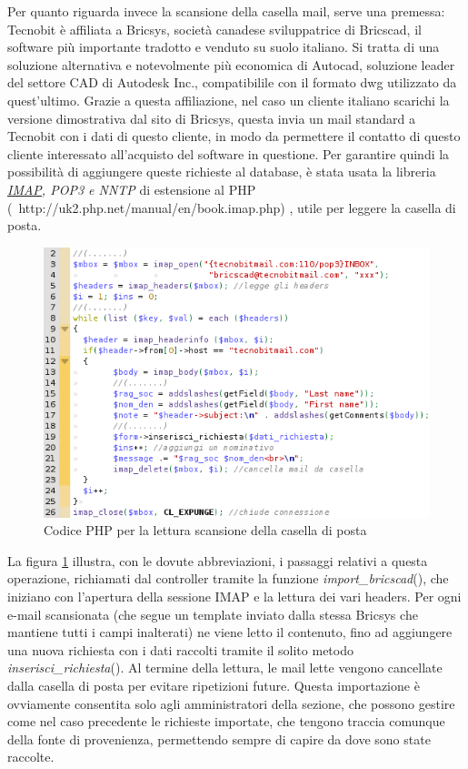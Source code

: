 \noindent
Per quanto riguarda invece la scansione della casella mail, serve una premessa: Tecnobit \`e affiliata a Bricsys\textregistered, societ\`a canadese sviluppatrice di Bricscad, il software pi\`u importante tradotto e venduto su suolo italiano. Si tratta di una soluzione alternativa e notevolmente pi\`u economica di Autocad, soluzione leader del settore CAD di Autodesk Inc., compatibilile con il formato dwg utilizzato da quest'ultimo. Grazie a questa affiliazione, nel caso un cliente italiano scarichi la versione dimostrativa dal sito di Bricsys, questa invia un mail standard a Tecnobit con i dati di questo cliente, in modo da permettere il contatto di questo cliente interessato all'acquisto del software in questione.
Per garantire quindi la possibilit\`a di aggiungere queste richieste al database, \`e stata usata la libreria \textit{\hyperlink{imap}{\underline{IMAP}}, POP3 e NNTP} di estensione al PHP (\ {http://uk2.php.net/manual/en/book.imap.php}) \cite{quattro}, utile per leggere la casella di posta.
\newpage

\begin{figure}[!ht]
\centering
  \includegraphics[scale=0.8]{./images/codicebrics.png}
\caption{Codice PHP per la lettura scansione della casella di posta}
\label{bricscode}
\end{figure}

\noindent La figura \ref{bricscode} illustra, con le dovute abbreviazioni, i passaggi relativi a questa operazione, richiamati dal controller tramite la funzione \textit{import\_bricscad}(), che iniziano con l'apertura della sessione IMAP e la lettura dei vari headers. Per ogni e-mail scansionata (che segue un template inviato dalla stessa Bricsys che mantiene tutti i campi inalterati) ne viene letto il contenuto, fino ad aggiungere una nuova richiesta con i dati raccolti tramite il solito metodo \textit{inserisci\_richiesta}(). Al termine della lettura, le mail lette vengono cancellate dalla casella di posta per evitare ripetizioni future.
Questa importazione \`e ovviamente consentita solo agli amministratori della sezione, che possono gestire come nel caso precedente le richieste importate, che tengono traccia comunque della fonte di provenienza, permettendo sempre di capire da dove sono state raccolte.

